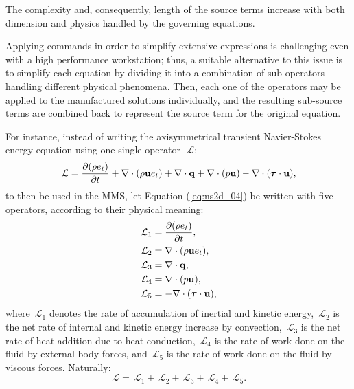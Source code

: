 \documentclass[10pt]{article}
\newcommand{\bv}[1]{\ensuremath{\mbox{\boldmath$ #1 $}}}
\newcommand{\Diff}[2] {\dfrac{\partial( #1)}{\partial #2}}
\newcommand{\Lo}{\,\mathcal{L}}
\begin{document}
The complexity and, consequently, length of the source terms increase with both dimension and physics handled by the governing equations.



Applying commands in order to simplify extensive expressions is challenging even with a high performance workstation; thus, a suitable alternative to this issue is to simplify each equation by dividing it into a combination of sub-operators handling different physical phenomena. Then, each one of the operators may be applied to the manufactured solutions individually, and the resulting sub-source terms are combined back to represent the source term for the original equation.



For instance, instead of writing the axisymmetrical transient Navier-Stokes energy equation using one single operator~$\Lo$:
\begin{equation}
 \label{eq:ns2d_04}
\Lo= \Diff{\rho e_t}{ t}+\nabla \cdot (\rho\mathbf{u}e_t) +\nabla\cdot \mathbf{q} +  \nabla\cdot(p  \mathbf{u})  - \nabla \cdot (\bv{\tau} \cdot \mathbf{u}),
\end{equation}
to then be used in the MMS, let Equation (\ref{eq:ns2d_04}) be written with five operators, according to their physical meaning:
\begin{equation}
 \begin{split}
  \Lo_1&=\Diff{\rho e_t}{ t},\\
  \Lo_2&=\nabla \cdot (\rho\mathbf{u}e_t),\\
  \Lo_3&=\nabla\cdot \mathbf{q},\\
  \Lo_4&= \nabla\cdot(p  \mathbf{u}),\\
  \Lo_5&=- \nabla \cdot (\bv{\tau} \cdot \mathbf{u}),
 \end{split}
\end{equation}
where $\Lo_1$ denotes the rate of accumulation of inertial and kinetic energy,   $\Lo_2$ is the net rate of internal and kinetic energy increase by convection, $\Lo_3$ is the net rate of heat addition due to heat conduction, $\Lo_4$ is the rate of work done on the fluid by external body forces, and $\Lo_5$ is the rate of work done on the fluid by viscous forces. Naturally:
\begin{equation}
 \label{op01}
\Lo=\Lo_1+\Lo_2+\Lo_3+\Lo_4+\Lo_5.
\end{equation}
\end{document}
